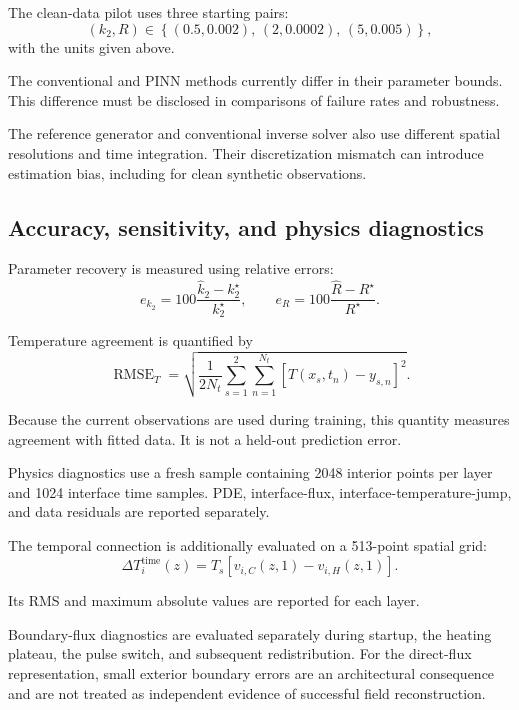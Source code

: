 \documentclass[11pt,a4paper]{article}
\newcommand{\RMSE}{\operatorname{RMSE}}
\begin{document}
The clean-data pilot uses three starting pairs:
\begin{equation}
(k_2,R)
\in
\left\{
(0.5,0.002),\,
(2,0.0002),\,
(5,0.005)
\right\},
\end{equation}
with the units given above.

The conventional and PINN methods currently differ in their
parameter bounds.
This difference must be disclosed in comparisons of failure
rates and robustness.

The reference generator and conventional inverse solver also
use different spatial resolutions and time integration.
Their discretization mismatch can introduce estimation bias,
including for clean synthetic observations.

\subsection{Accuracy, sensitivity, and physics diagnostics}

Parameter recovery is measured using relative errors:
\begin{equation}
e_{k_2}
=
100\frac{\widehat k_2-k_2^\star}{k_2^\star},
\qquad
e_R
=
100\frac{\widehat R-R^\star}{R^\star}.
\end{equation}

Temperature agreement is quantified by
\begin{equation}
\RMSE_T
=
\sqrt{
\frac{1}{2N_t}
\sum_{s=1}^{2}\sum_{n=1}^{N_t}
[\widehat T(x_s,t_n)-y_{s,n}]^2
}.
\end{equation}

Because the current observations are used during training,
this quantity measures agreement with fitted data.
It is not a held-out prediction error.

Physics diagnostics use a fresh sample containing 2048
interior points per layer and 1024 interface time samples.
PDE, interface-flux, interface-temperature-jump, and data
residuals are reported separately.

The temporal connection is additionally evaluated on a
513-point spatial grid:
\begin{equation}
\Delta T_i^{\mathrm{time}}(z)
=
T_s[v_{i,C}(z,1)-v_{i,H}(z,1)].
\end{equation}

Its RMS and maximum absolute values are reported for each
layer.

Boundary-flux diagnostics are evaluated separately during
startup, the heating plateau, the pulse switch, and subsequent
redistribution.
For the direct-flux representation, small exterior boundary
errors are an architectural consequence and are not treated
as independent evidence of successful field reconstruction.
\end{document}
